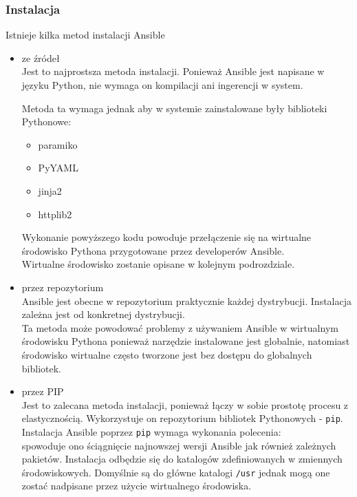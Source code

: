 \subsubsection{Instalacja}
\label{sec:konfiguracja_ansible_instalacja}
Istnieje kilka metod instalacji Ansible
\begin{itemize}
\item ze źródeł\\
Jest to najprostsza metoda instalacji. Ponieważ Ansible jest napisane w języku Python, nie wymaga on kompilacji ani ingerencji w system.

Metoda ta wymaga jednak aby w systemie zainstalowane były biblioteki Pythonowe:
\begin{itemize}
\item paramiko
\item PyYAML
\item jinja2
\item httplib2
\end{itemize}
Wykonanie powyższego kodu powoduje przełączenie się na wirtualne środowisko Pythona przygotowane przez developerów Ansible.\\
Wirtualne środowisko zostanie opisane w kolejnym podrozdziale.
\item przez repozytorium\\
Ansible jest obecne w repozytorium praktycznie każdej dystrybucji. Instalacja zależna jest od konkretnej dystrybucji.\\
Ta metoda może powodować problemy z używaniem Ansible w wirtualnym środowisku Pythona ponieważ narzędzie instalowane jest globalnie, natomiast środowisko wirtualne często tworzone jest bez dostępu do globalnych bibliotek.
\item przez PIP\\
Jest to zalecana metoda instalacji, ponieważ łączy w sobie prostotę procesu z elastycznością.
Wykorzystuje on repozytorium bibliotek Pythonowych - \texttt{pip}.\\
Instalacja Ansible poprzez \texttt{pip} wymaga wykonania polecenia:\\

spowoduje ono ściągnięcie najnowszej wersji Ansible jak również zależnych pakietów.
Instalacja odbędzie się do katalogów zdefiniowanych w zmiennych środowiskowych. Domyślnie są do główne katalogi \texttt{/usr} jednak mogą one zostać nadpisane przez użycie wirtualnego środowiska.
\end{itemize}
